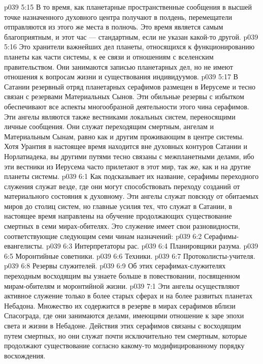 \vs p039 5:15 \pc В то время, как планетарные пространственные сообщения в высшей точке назначенного духовного центра получают в полдень, перемещатели отправляются из этого же места в полночь. Это время является самым благоприятным, и этот час --- стандартным, если не указан какой\hyp{}то другой.
\vs p039 5:16 \pc {}\bibnobreakspace {} Это хранители важнейших дел планеты, относящихся к функционированию планеты как части системы, к ее связи и отношениям с вселенским правительством. Они занимаются записью планетарных дел, но не имеют отношения к вопросам жизни и существования индивидуумов.
\vs p039 5:17 \pc {}\bibnobreakspace {} В Сатании резервный отряд планетарных серафимов размещен в Иерусеме и тесно связан с резервами Материальных Сынов. Эти обильные резервы с избытком обеспечивают все аспекты многообразной деятельности этого чина серафимов. Эти ангелы являются также вестниками локальных систем, переносящими личные сообщения. Они служат переходящим смертным, ангелам и Материальным Сынам, равно как и другим проживающим в центре системы. Хотя Урантия в настоящее время находится вне духовных контуров Сатании и Норлатиадека, вы другими путями тесно связаны с межпланетными делами, ибо эти вестники из Иерусема часто прилетают в этот мир, так же, как и на другие планеты системы.
\vs p039 6:1 Как подсказывает их название, серафимы переходного служения служат везде, где они могут способствовать переходу созданий от материального состояния к духовному. Эти ангелы служат повсюду от обитаемых миров до столиц систем, но главные усилия тех, что служат в Сатании, в настоящее время направлены на обучение продолжающих существование смертных в семи мирах\hyp{}обителях. Это служение имеет свои разновидности, соответствующие следующим семи чинам назначений:
\vs p039 6:2 \bibnobreakspace Серафимы\hyp{}евангелисты.
\vs p039 6:3 \bibnobreakspace Интерпретаторы рас.
\vs p039 6:4 \bibnobreakspace Планировщики разума.
\vs p039 6:5 \bibnobreakspace Моронтийные советники.
\vs p039 6:6 \bibnobreakspace Техники.
\vs p039 6:7 \bibnobreakspace Протоколисты\hyp{}учителя.
\vs p039 6:8 \bibnobreakspace Резервы служителей.
\vs p039 6:9 \pc Об этих серафимах\hyp{}служителях переходным восходящим вы узнаете больше в повествовании, посвященном мирам\hyp{}обителям и моронтийной жизни.
\vs p039 7:1 Эти ангелы осуществляют активное служение только в более старых сферах и на более развитых планетах Небадона. Множество их содержится в резерве в мирах серафимов вблизи Спасограда, где они занимаются делами, имеющими отношение к заре эпохи света и жизни в Небадоне. Действия этих серафимов связаны с восходящим путем смертных, но они служат почти исключительно тем смертным, которые продолжают существование согласно какому\hyp{}то модифицированному порядку восхождения.
